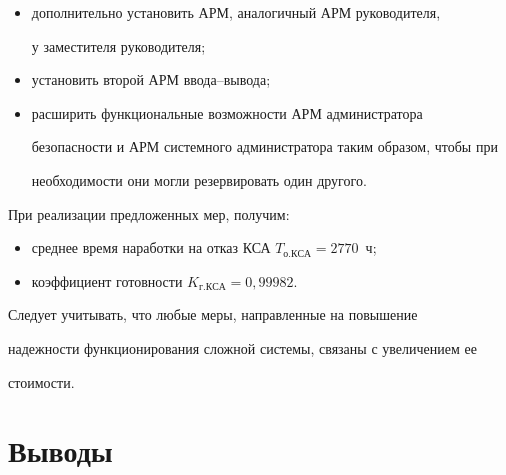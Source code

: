      \begin{itemize}


     \item дополнительно установить АРМ, аналогичный АРМ руководителя, 


у за\-мес\-ти\-те\-ля руководителя;


\item  установить второй АРМ ввода--вывода;


     \item расширить функциональные возможности АРМ администратора 


безопас\-ности и АРМ системного администратора таким образом, чтобы при 


необходимости они могли резервировать один другого.


     \end{itemize}


     


     При реализации предложенных мер, получим:


     \begin{itemize}


     \item  среднее время наработки на отказ КСА $T_{\mathrm{о.КСА}} = 


2770$~ч;


     \item  коэффициент готовности $K_{\mathrm{г.КСА}} = 0{,}99982$.


     \end{itemize}


     


     Следует учитывать, что любые меры, направленные на повышение 


на\-деж\-ности функционирования сложной системы, связаны с увеличением ее 


стоимости.


     


     \section{Выводы}


     


     \noindent


